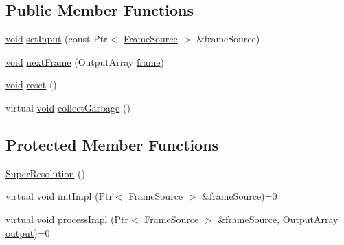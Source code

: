 \subsection*{Public Member Functions}
\begin{DoxyCompactItemize}
\item 
\hyperlink{legacy_8hpp_a8bb47f092d473522721002c86c13b94e}{void} \hyperlink{classcv_1_1superres_1_1SuperResolution_ac925acc676cb1141c801fa99eed66373}{set\-Input} (const Ptr$<$ \hyperlink{classcv_1_1superres_1_1FrameSource}{Frame\-Source} $>$ \&frame\-Source)
\item 
\hyperlink{legacy_8hpp_a8bb47f092d473522721002c86c13b94e}{void} \hyperlink{classcv_1_1superres_1_1SuperResolution_adf3e4f77d454b28001c1844f93a97818}{next\-Frame} (Output\-Array \hyperlink{core__c_8h_a0430deaafd9043e478f306e33961299d}{frame})
\item 
\hyperlink{legacy_8hpp_a8bb47f092d473522721002c86c13b94e}{void} \hyperlink{classcv_1_1superres_1_1SuperResolution_a3b3b05ea8f9520e98c4a7f5c7a649392}{reset} ()
\item 
virtual \hyperlink{legacy_8hpp_a8bb47f092d473522721002c86c13b94e}{void} \hyperlink{classcv_1_1superres_1_1SuperResolution_ac37de1a8bab83e86b3a540612dc2db1d}{collect\-Garbage} ()
\end{DoxyCompactItemize}
\subsection*{Protected Member Functions}
\begin{DoxyCompactItemize}
\item 
\hyperlink{classcv_1_1superres_1_1SuperResolution_a6b6da407515d5def4552cf513ae9e98a}{Super\-Resolution} ()
\item 
virtual \hyperlink{legacy_8hpp_a8bb47f092d473522721002c86c13b94e}{void} \hyperlink{classcv_1_1superres_1_1SuperResolution_ace2f85404fb03491e9a36bc6ba595e97}{init\-Impl} (Ptr$<$ \hyperlink{classcv_1_1superres_1_1FrameSource}{Frame\-Source} $>$ \&frame\-Source)=0
\item 
virtual \hyperlink{legacy_8hpp_a8bb47f092d473522721002c86c13b94e}{void} \hyperlink{classcv_1_1superres_1_1SuperResolution_ab891ad01fa46db6bdb8f6b3277390b75}{process\-Impl} (Ptr$<$ \hyperlink{classcv_1_1superres_1_1FrameSource}{Frame\-Source} $>$ \&frame\-Source, Output\-Array \hyperlink{legacy_8hpp_ad2a91d797896d7d86e0c03dc705a4abc}{output})=0
\end{DoxyCompactItemize}


